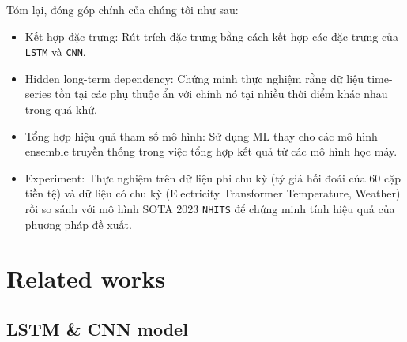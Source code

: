 \documentclass[aps,prb,groupedaddress,twocolumn,showpacs,dvipdfmx,superscriptaddress,pdftex]{revtex4-2}
\begin{document}
\vspace{2mm}

Tóm lại, đóng góp chính của chúng tôi như sau:

\begin{itemize}
    \item Kết hợp đặc trưng: Rút trích đặc trưng bằng cách kết hợp các đặc trưng của \verb|LSTM| và \verb|CNN|.
    \item Hidden long-term dependency: Chứng minh thực nghiệm rằng dữ liệu time-series tồn tại các phụ thuộc ẩn với chính nó tại nhiều thời điểm khác nhau trong quá khứ.
    \item Tổng hợp hiệu quả tham số mô hình: Sử dụng ML thay cho các mô hình ensemble truyền thống trong việc tổng hợp kết quả từ các mô hình học máy.
    \item Experiment: Thực nghiệm trên dữ liệu phi chu kỳ (tỷ giá hối đoái của 60 cặp tiền tệ) và dữ liệu có chu kỳ (Electricity Transformer Temperature, Weather) rồi so sánh với mô hình SOTA 2023 \verb|NHITS| để chứng minh tính hiệu quả của phương pháp đề xuất.
\end{itemize}


\section{Related works}
\label{sec.relatedWork}

\subsection{LSTM \& CNN model}
\end{document}
